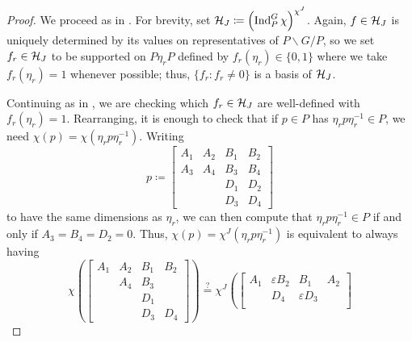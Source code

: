 \begin{proof}
	We proceed as in . For brevity, set $\mathcal{H}_J\coloneqq\left(\operatorname{Ind}_P^G\chi\right)^{\chi^J}$. Again, $f\in\mathcal{H}_J$ is uniquely determined by its values on representatives of $P\backslash G/P$, so we set $f_r\in\mathcal{H}_J$ to be supported on $P\eta_rP$ defined by $f_r(\eta_r)\in\{0,1\}$ where we take $f_r(\eta_r)=1$ whenever possible; thus, $\{f_r:f_r\ne0\}$ is a basis of $\mathcal{H}_J$.

	Continuing as in , we are checking which $f_r\in\mathcal{H}_J$ are well-defined with $f_r(\eta_r)=1$.
    Rearranging, it is enough to check that
    if $p\in P$ has $\eta_rp\eta_r^{-1}\in P$, we need $\chi(p)=\chi\left(\eta_rp\eta_r^{-1}\right)$. Writing
	\[p\coloneqq\begin{bmatrix}
        A_1 & A_2 & B_1 & B_2 \\
        A_3 & A_4 & B_3 & B_4 \\
            &     & D_1 & D_2 \\
            &     & D_3 & D_4
    \end{bmatrix}\]
    to have the same dimensions as $\eta_r$, we can then compute that $\eta_rp\eta_r^{-1} \in P$
    if and only if $A_3=B_4=D_2=0$. Thus, $\chi(p)=\chi^J\left(\eta_rp\eta_r^{-1}\right)$ is equivalent to always having
	\[\chi\left(\begin{bmatrix}
        A_1 & A_2 & B_1 & B_2 \\
            & A_4 & B_3 &     \\
            &     & D_1 &     \\
            &     & D_3 & D_4
    \end{bmatrix}\right)\stackrel?=\chi^J\left(\begin{bmatrix}
        A_1 & \varepsilon B_2 &  B_1 & A_2 \\
            &  D_4 & \varepsilon D_3 \\

\end{bmatrix}\]
\end{proof}
